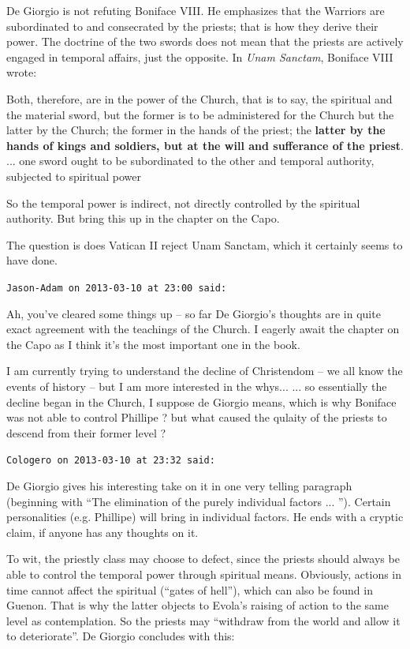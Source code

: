 \begin{footnotesize}
\begin{sffamily}
De Giorgio is not refuting Boniface VIII. He emphasizes that the Warriors are subordinated to and consecrated by the priests; that is how they derive their power. The doctrine of the two swords does not mean that the priests are actively engaged in temporal affairs, just the opposite. In \emph{Unam Sanctam}, Boniface VIII wrote:

\begin{quotex}
Both, therefore, are in the power of the Church, that is to say, the spiritual and the material sword, but the former is to be administered for the Church but the latter by the Church; the former in the hands of the priest; the \textbf{latter by the hands of kings and soldiers, but at the will and sufferance of the priest}. ... one sword ought to be subordinated to the other and temporal authority, subjected to spiritual power
\end{quotex}


So the temporal power is indirect, not directly controlled by the spiritual authority. But bring this up in the chapter on the Capo.

The question is does Vatican II reject Unam Sanctam, which it certainly seems to have done.

\hfill

\texttt{Jason-Adam on 2013-03-10 at 23:00 said:}

Ah, you've cleared some things up -- so far De Giorgio's thoughts are in quite exact agreement with the teachings of the Church. I eagerly await the chapter on the Capo as I think it's the most important one in the book.

I am currently trying to understand the decline of Christendom -- we all know the events of history -- but I am more interested in the whys... ... so essentially the decline began in the Church, I suppose de Giorgio means, which is why Boniface was not able to control Phillipe ? but what caused the qulaity of the priests to descend from their former level ?

\hfill

\texttt{Cologero on 2013-03-10 at 23:32 said:}

De Giorgio gives his interesting take on it in one very telling paragraph (beginning with ``The elimination of the purely individual factors ... ''). Certain personalities (e.g. Phillipe) will bring in individual factors. He ends with a cryptic claim, if anyone has any thoughts on it.

To wit, the priestly class may choose to defect, since the priests should always be able to control the temporal power through spiritual means. Obviously, actions in time cannot affect the spiritual (``gates of hell''), which can also be found in Guenon. That is why the latter objects to Evola's raising of action to the same level as contemplation. So the priests may ``withdraw from the world and allow it to deteriorate''. De Giorgio concludes with this:


\end{sffamily}
\end{footnotesize}
